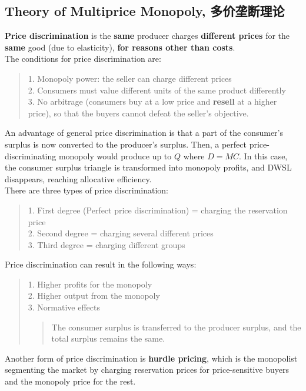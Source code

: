 \subsection{Theory of Multiprice Monopoly, 多价垄断理论}
\textbf{Price discrimination} is the \textbf{same} producer charges \textbf{different prices} for the \textbf{same} good (due to elasticity), \textbf{for reasons other than costs}. \\
The conditions for price discrimination are:
\begin{quote}
    1. Monopoly power: the seller can charge different prices \\
    2. Consumers must value different units of the same product differently \\
    3. No arbitrage (consumers buy at a low price and \textbf{resell} at a higher price), so that the buyers cannot defeat the seller's objective.
\end{quote}
An advantage of general price discrimination is that a part of the consumer's surplus is now converted to the producer's surplus. Then, a perfect price-discriminating monopoly would produce up to $Q$ where $D = MC$. In this case, the consumer surplus triangle is transformed into monopoly profits, and DWSL disappears, reaching allocative efficiency. \\
There are three types of price discrimination:
\begin{quote}
    1. First degree (Perfect price discrimination) = charging the reservation price \\
    2. Second degree = charging several different prices \\
    3. Third degree = charging different groups
\end{quote}
Price discrimination can result in the following ways:
\begin{quote}
    1. Higher profits for the monopoly \\
    2. Higher output from the monopoly \\
    3. Normative effects
    \begin{quote}
        The consumer surplus is transferred to the producer surplus, and the total surplus remains the same.
    \end{quote}
\end{quote}
Another form of price discrimination is \textbf{hurdle pricing}, which is the monopolist segmenting the market by charging reservation prices for price-sensitive buyers and the monopoly price for the rest.
\newpage